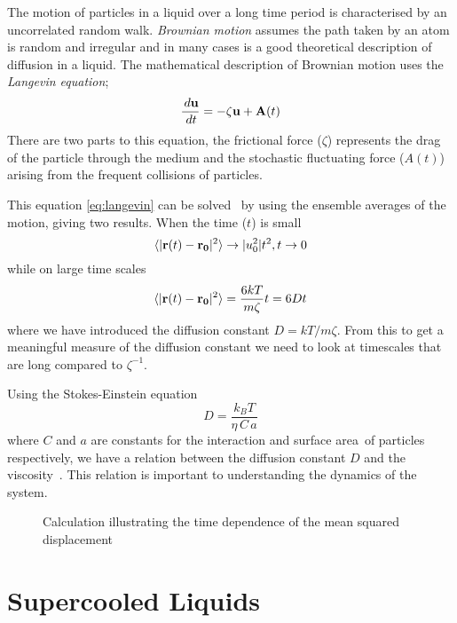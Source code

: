 The motion of particles in a liquid over a long time period is characterised by an uncorrelated random walk. \emph{Brownian motion} assumes the path taken by an atom is random and irregular and in many cases is a good theoretical description of diffusion in a liquid. The mathematical description of Brownian motion uses the \emph{Langevin equation};
\begin{equation}
    \frac{\,d \mathbf{u}}{\,d t} = - \zeta \mathbf{u} + \mathbf{A}(t)
    \label{eq:langevin}
\end{equation}
There are two parts to this equation, the frictional force ($\zeta$) represents the drag of the particle through the medium and the stochastic fluctuating force ($A(t)$) arising from the frequent collisions of particles.

This equation \eqref{eq:langevin} can be solved~\cite{mcquarrie:76} by using the ensemble averages of the motion, giving two results. When the time ($t$) is small
\begin{equation}
    \langle | \mathbf{r}(t) - \mathbf{r_0}|^2 \rangle \rightarrow |u_0^2|t^2,   t \rightarrow 0
\end{equation}
while on large time scales
\begin{equation}
    \langle | \mathbf{r}(t) - \mathbf{r_0} |^2 \rangle = \frac{6kT}{m\zeta} t = 6Dt
\end{equation}
where we have introduced the diffusion constant $D = kT/m\zeta$. From this to get a meaningful measure of the diffusion constant we need to look at timescales that are long compared to $\zeta^{-1}$.

Using the Stokes-Einstein equation
\begin{equation}
    D=\frac{k_B T}{\eta\,C\,a}
\end{equation}
where $C$ and $a$ are constants for the interaction and surface area~\tocheck of particles respectively, we have a relation between the diffusion constant $D$ and the viscosity~\tocite. This relation is important to understanding the dynamics of the system.

\begin{figure}
    \label{fig:MSD}
    \caption{Calculation illustrating the time dependence of the mean squared displacement}
\end{figure}



\section{Supercooled Liquids}

